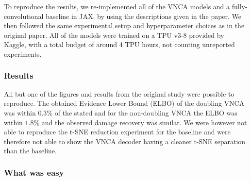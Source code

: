 To reproduce the results, we re-implemented all of the VNCA models and a fully-convolutional baseline in JAX, by using the descriptions given in the paper. We then followed the same experimental setup and hyperparameter choices as in the original paper. 
All of the models were trained on a TPU v3-8 provided by Kaggle, with a total budget of around 4 TPU hours, not counting unreported experiments.


\subsubsection*{Results}


All but one of the figures and results from the original study were possible to reproduce. The obtained Evidence Lower Bound (ELBO) of the doubling VNCA was within $0.3\%$ of the stated and for the non-doubling VNCA the ELBO was within $1.8\%$ and the observed damage recovery was similar. We were however not able to reproduce the t-SNE reduction experiment for the baseline and were therefore not able to show the VNCA decoder having a cleaner t-SNE separation than the baseline.

\subsubsection*{What was easy}


